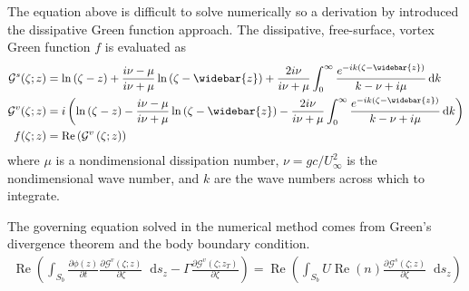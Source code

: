 \documentclass[10pt]{article}
\newcommand{\diff}{\mathop{}\!\tn{d}} %
\newcommand{\pp}[2]{\frac{\partial #1}{\partial #2}}
\newcommand{\mcal}[1]{\mathcal{#1}} %
\newcommand{\beq}{\begin{equation}\begin{aligned}}
\newcommand{\eeq}{\end{aligned}\end{equation}}
\newcommand{\Uinf}{U_{\infty}}
\newcommand{\tn}[1]{\textrm{#1}}
\renewcommand{\Re}{\operatorname{Re}}
\begin{document}
The equation above is difficult to solve numerically so a derivation by \citet{Chen2012} introduced the dissipative Green function approach.
The dissipative, free-surface, vortex Green function $f$ is evaluated as
\beq
\mcal{G}^s(\zeta;z) & =  \ln \left(\zeta - z\right)
+ \frac{i \nu -\mu}{i \nu + \mu} \ln \left(\zeta - \widebar{z}\right)
+ \frac{2i\nu}{i \nu + \mu} \int_{0}^{\infty}  \frac{e^{-ik\left(\zeta - \widebar{z} \right)}}{k-\nu + i\mu}\diff k
\\
\mcal{G}^v(\zeta;z) & =  i \left(\ln \left(\zeta - z\right)
- \frac{i \nu -\mu}{i \nu + \mu} \ln \left(\zeta - \widebar{z}\right)
- \frac{2i\nu}{i \nu + \mu} \int_{0}^{\infty}  \frac{e^{-ik\left(\zeta - \widebar{z} \right)}}{k-\nu + i\mu}\diff k
\right)
\\
f(\zeta;z) & = \Re \left(\mcal{G}^v\left(\zeta;z\right)\right)
\eeq
where $\mu$ is a nondimensional dissipation number, $\nu=gc/\Uinf^2$ is the nondimensional wave number, and $k$ are the wave numbers across which to integrate.

The governing equation solved in the numerical method comes from Green's divergence theorem and the body boundary condition.
\beq
\Re\left(
\int_{S_b}^{} \pp{\phi(z)}{t} \pp{\mcal{G}^v(\zeta;z)}{\zeta} \diff s_z
- \Gamma \pp{\mcal{G}^v(\zeta;z_T)}{\zeta}
\right)
=
\Re\left(
\int_{S_b}^{} U \Re(n) \pp{\mcal{G}^s(\zeta;z)}{\zeta} \diff s_z
\right)
\eeq
\end{document}
